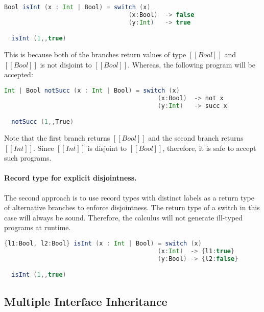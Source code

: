 \begin{lstlisting}[language=Scala]
  Bool isInt (x : Int | Bool) = switch (x)
                                  (x:Bool)  -> false
                                  (y:Int)   -> true

  isInt (1,,true)
\end{lstlisting}

\noindent This is because both of the branches return values
of type $[[Bool]]$ and $[[Bool]]$ is not disjoint
to $[[Bool]]$. Whereas, the following program will
be accepted:

\begin{lstlisting}[language=Scala]
  Int | Bool notSucc (x : Int | Bool) = switch (x)
                                          (x:Bool)  -> not x
                                          (y:Int)   -> succ x

  notSucc (1,,True)
\end{lstlisting}

\noindent Note that the first branch returns $[[Bool]]$ and
the second branch returns $[[Int]]$. Since $[[Int]]$
is disjoint to $[[Bool]]$, therefore, it is safe to accept
such programs.

\paragraph{Record type for explicit disjointness.}
The second approach is to use record types with distinct
labels as a return type of alternative branches to enforce disjointness.
The return type of a switch in this case will always be
sound. Therefore, the calculus will not generate
ill-typed programs at runtime.

\begin{lstlisting}[language=Scala]
  {l1:Bool, l2:Bool} isInt (x : Int | Bool) = switch (x)
                                          (x:Int)  -> {l1:true}
                                          (y:Bool) -> {l2:false}

  isInt (1,,true)
\end{lstlisting}




\subsection{Multiple Interface Inheritance}

